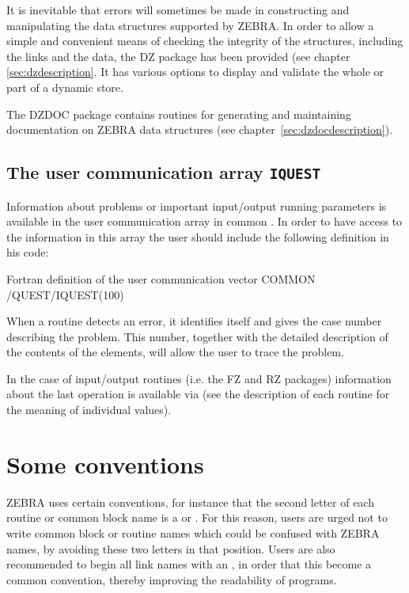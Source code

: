 It is inevitable that errors will sometimes be made in constructing and
manipulating the data structures supported by ZEBRA. 
In order to allow
a simple and convenient means of checking the integrity of the structures,
including the links and the data, the DZ package has been provided
(see chapter \ref{sec:dzdescription}.
It has various options to display and validate the whole or part of a dynamic
store.

The DZDOC package contains routines for generating and maintaining documentation
on ZEBRA data structures (see chapter~\ref{sec:dzdocdescription}).

\subsection{The user communication array {\tt IQUEST}}

Information about problems or important input/output running
parameters is available in the user communication array 
\IQUEST{} in common \Lit{/\QUEST/}. 
In order to have access to the information in this array
the user should include the following definition in his code:
\begin{XMPt}{Fortran definition of the user communication vector }
      COMMON /QUEST/IQUEST(100)
\end{XMPt}
When a routine detects an error, it identifies itself and gives the
case number describing the problem. 
This number, together with the
detailed description of the contents of the \IQUEST{} elements, will allow
the user to trace the problem.

In the case of input/output routines (i.e. the FZ and RZ packages)
information about the last operation is available via \IQUEST{}
(see the description of each routine for the meaning of individual 
\IQUEST{} values).

\section{Some conventions}

ZEBRA uses certain conventions,
for instance that the second letter of each routine or common block
name is a  or . 
For this reason, users are urged not to
write common block or routine names which could be confused with ZEBRA
names, by avoiding these two letters in that position. 
Users are also
recommended to begin all link names with an , in order that this become
a common convention, thereby improving the readability of programs.

